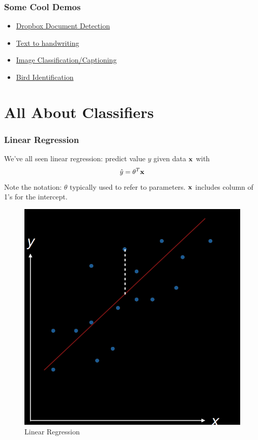 \documentclass[10pt]{beamer}
\begin{document}
\begin{frame}
	\frametitle{Some Cool Demos}
	\begin{itemize}
		\item \href{https://blogs.dropbox.com/tech/2016/08/fast-and-accurate-document-detection-for-scanning/}{Dropbox Document Detection}
		\item \href{http://www.cs.toronto.edu/~graves/handwriting.cgi?text=I+am+really+hungry&style=&bias=0.15&samples=3}{Text to handwriting}
		\item \href{https://www.clarifai.com/demo}{Image Classification/Captioning}
		\item \href{http://www.birdsnap.com/species/}{Bird Identification}
	\end{itemize}
\end{frame}


\section{All About Classifiers}

\begin{frame}
	\frametitle{Linear Regression}
	We've all seen linear regression: predict value $y$ given data $\vb{x}$ with
	\begin{equation}
		\hat{y} = \vb{\theta}^T \vb{x}
	\end{equation}
	Note the notation: $\theta$ typically used to refer to parameters. $\vb{x}$ includes column of 1's for the intercept.
	\begin{figure}
		\includegraphics[width=\textwidth,height=0.3\textheight,keepaspectratio=true]{linear_regression.png}
		\caption{Linear Regression}
		\label{fig:linear-regression}
	\end{figure}
\end{frame}
\end{document}

